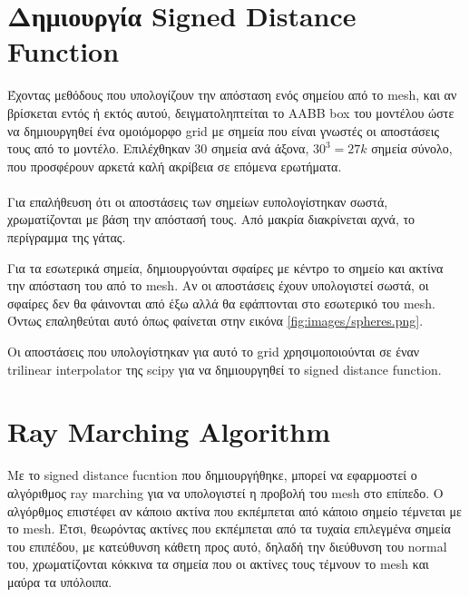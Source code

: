 \documentclass{report}
\begin{document}
\section{Δημιουργία Signed Distance Function}
Έχοντας μεθόδους που υπολογίζουν την απόσταση ενός σημείου από το mesh, και αν βρίσκεται εντός ή εκτός αυτού, δειγματοληπτείται
το AABB box του μοντέλου ώστε να δημιουργηθεί ένα ομοιόμορφο grid με σημεία που είναι γνωστές οι αποστάσεις τους 
από το μοντέλο. Επιλέχθηκαν 30 σημεία ανά άξονα, $30^3 = 27k$ σημεία σύνολο, που προσφέρουν αρκετά καλή ακρίβεια σε
επόμενα ερωτήματα.
\\\\
Για επαλήθευση ότι οι αποστάσεις των σημείων ευπολογίστηκαν σωστά, χρωματίζονται με βάση την απόστασή τους. Από μακρία
διακρίνεται αχνά, το περίγραμμα της γάτας.


Για τα εσωτερικά σημεία, δημιουργούνται σφαίρες με κέντρο το σημείο και ακτίνα την απόσταση του από το mesh. Αν οι αποστάσεις έχουν
υπολογιστεί σωστά, οι σφαίρες δεν θα φάινονται από έξω αλλά θα εφάπτονται στο εσωτερικό του mesh. Όντως επαληθεύται αυτό 
όπως φαίνεται στην εικόνα \ref{fig:images/spheres.png}.


Οι αποστάσεις που υπολογίστηκαν για αυτό το grid χρησιμοποιούνται σε έναν trilinear interpolator της scipy \cite{2020SciPy-NMeth}
για να δημιουργηθεί το signed distance function.

\section{Ray Marching Algorithm}
Με το signed distance fucntion που δημιουργήθηκε, μπορεί να εφαρμοστεί ο αλγόριθμος ray marching για να υπολογιστεί η
προβολή του mesh στο επίπεδο. Ο αλγόρθμος επιστέφει αν κάποιο ακτίνα που εκπέμπεται από κάποιο σημείο τέμνεται με το mesh.
Έτσι, θεωρόντας ακτίνες που εκπέμπεται από τα τυχαία επιλεγμένα σημεία του επιπέδου, με κατεύθυνση κάθετη προς αυτό, δηλαδή
την διεύθυνση του normal του, χρωματίζονται κόκκινα τα σημεία που οι ακτίνες τους τέμνουν το mesh και μαύρα τα υπόλοιπα.

\end{document}
